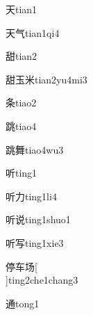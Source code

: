 \begin{verbete}[4]{天}{tian1}
\end{verbete}

\begin{verbete}[4;4]{天气}{tian1qi4}
\end{verbete}

\begin{verbete}[11]{甜}{tian2}
\end{verbete}

\begin{verbete}[11;5;6]{甜玉米}{tian2yu4mi3}
\end{verbete}

\begin{verbete}[7]{条}{tiao2}
\end{verbete}

\begin{verbete}[13]{跳}{tiao4}
\end{verbete}

\begin{verbete}[13;14]{跳舞}{tiao4wu3}
\end{verbete}

\begin{verbete}[7]{听}{ting1}
\end{verbete}

\begin{verbete}[7;2]{听力}{ting1li4}
\end{verbete}

\begin{verbete}[7;9]{听说}{ting1shuo1}
\end{verbete}

\begin{verbete}[7;5]{听写}{ting1xie3}
\end{verbete}

\begin{verbete}[11;4;6]{停车场}[\\]{ting2che1chang3}
\end{verbete}

\begin{verbete}[10]{通}{tong1}
\end{verbete}

